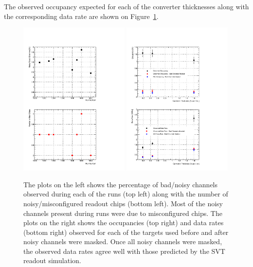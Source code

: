The observed occupancy expected for each of the converter thicknesses along with the 
corresponding data rate are shown on Figure~\ref{fig:data_rates}.
\begin{figure}[h]
    \begin{center}
    	\includegraphics[width=0.49\textwidth]{test2012/svtperformance/daq/n_dead_channels_v2.pdf}
    	\includegraphics[width=0.49\textwidth]{test2012/svtperformance/daq/data_rates.pdf}
        \caption{
                    The plots on the left shows the percentage of bad/noisy channels observed
                    during each of the runs (top left) along with the number of noisy/misconfigured 
                    readout chips (bottom left).  Most of the noisy channels present during runs were
                    due to misconfigured chips.  The  plots on the right shows the occupancies (top right)
                    and data rates (bottom right) observed for each of the targets used before and after 
                    noisy channels were masked. Once all noisy channels
                    were masked, the observed data rates agree well with those predicted by the
                    SVT readout simulation. 
                } 
	\label{fig:data_rates}
    \end{center}
\end{figure}
